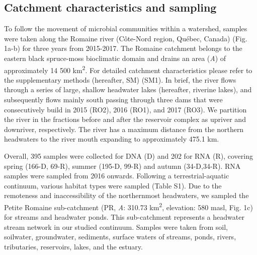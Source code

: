 \documentclass[12pt,a4paper]{article} %
\begin{document}
\subsection*{Catchment characteristics and sampling}
To follow the movement of microbial communities within a watershed, samples were taken along the Romaine river (C\^{o}te-Nord region, Qu\'{e}bec, Canada) (Fig. 1a-b) for three years from 2015-2017. The Romaine catchment belongs to the eastern black spruce-moss bioclimatic domain and drains an area (\textit{A}) of approximately 14 500 km\textsuperscript{2}. For detailed catchment characteristics please refer to the supplementary methods (hereafter, SM) (SM1). In brief, the river flows through a series of large, shallow headwater lakes (hereafter, riverine lakes), and subsequently flows mainly south passing through three dams that were consecutively build in 2015 (RO2), 2016 (RO1), and 2017 (RO3). We partition the river in the fractions before and after the reservoir complex as upriver and downriver, respectively. The river has a maximum distance from the northern headwaters to the river mouth expanding to approximately 475.1 km.

Overall, 395 samples were collected for DNA (D) and 202 for RNA (R), covering spring (166-D, 69-R), summer (195-D, 99-R) and autumn (34-D,34-R). RNA samples were sampled from 2016 onwards. Following a terrestrial-aquatic continuum, various habitat types were sampled (Table S1). Due to the remoteness and inaccessibility of the northernmost headwaters, we sampled the Petite Romaine sub-catchment (PR, \textit{A}: 310.73 km\textsuperscript{2}, elevation: 580 masl, Fig. 1c) for streams and headwater ponds. This sub-catchment represents a headwater stream network in our studied continuum. Samples were taken from soil, soilwater, groundwater, sediments, surface waters of streams, ponds, rivers, tributaries, reservoirs, lakes, and the estuary.
\end{document}
